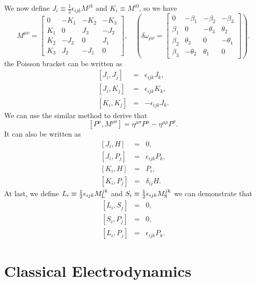 We now define $J_i \equiv \frac{1}{2} \epsilon_{ijk} M^{jk}$ and $K_i \equiv M^{i0}$, so we have
\[M^{\mu \nu} = \left[ 
\begin{matrix} 
0   & -K_1 & -K_2 & -K_3 \\ 
K_1 & 0    & J_3  & -J_2 \\
K_2 & -J_3 & 0    &  J_1 \\
K_3 & J_2  & -J_1 &  0
\end{matrix} 
\right] , \quad \left( 
\delta \omega_{\mu\nu} = \left[
\begin{matrix} 
0       & -\beta_1   & -\beta_2   & -\beta_3   \\ 
\beta_1 & 0         & -\theta_3 & \theta_2  \\
\beta_2 & \theta_3  & 0         & -\theta_1 \\
\beta_3 & -\theta_2 & \theta_1  & 0
\end{matrix} 
\right] \right).\] 
the Poisson bracket can be written as
\begin{eqnarray}
	\left[J_i,J_j\right] &=& \epsilon_{ijk}J_k , \nonumber \\
	\left[J_i,K_j\right] &=& \epsilon_{ijk}K_k ,\nonumber \\
	\left[K_i,K_j\right] &=& -\epsilon_{ijk}J_k .\nonumber
\end{eqnarray}
We can use the similar method to derive that
\[[P^{\mu},M^{\rho \sigma}] = \eta^{\mu \sigma}P^{\mu} - \eta^{\mu \rho}P^{\sigma}.\]
It can also be written as
\begin{eqnarray}
	\left[J_i,H\right] &=& 0 ,\nonumber \\
	\left[J_i,P_j\right] &=& \epsilon_{ijk}P_k, \nonumber \\
	\left[K_i,H\right] &=& P_i ,\nonumber \\
	\left[K_i,P_j\right] &=& \delta_{ij}H .\nonumber
\end{eqnarray}
At last, we define $L_i \equiv \frac{1}{2} \epsilon_{ijk} M_{\rm L}^{jk}$ and $S_i \equiv \frac{1}{2} \epsilon_{ijk} M_{\rm S}^{jk}$
we can demonstrate that
\begin{eqnarray}
	\left[L_i,S_j\right] &=& 0 ,\nonumber \\
	\left[S_i,P_j\right] &=& 0, \nonumber \\
	\left[L_i,P_j\right] &=& \epsilon_{ijk}P_k . \nonumber
\end{eqnarray}

\chapter{Classical Electrodynamics}
